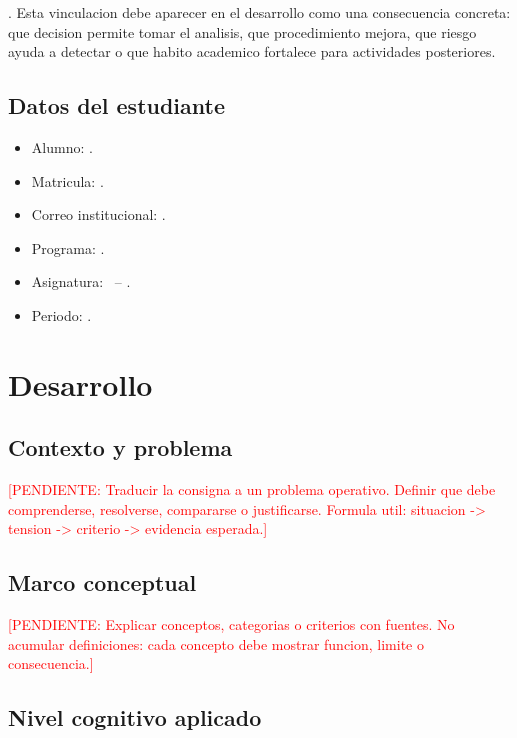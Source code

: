 \documentclass[
	spanish,
	letterpaper, oneside
]{article}
\newcommand{\pendiente}[1]{\textcolor{red}{[PENDIENTE: #1]}}
\begin{document}
\itescaprofessionalprofile. Esta vinculacion debe aparecer en el desarrollo
como una consecuencia concreta: que decision permite tomar el analisis, que
procedimiento mejora, que riesgo ayuda a detectar o que habito academico
fortalece para actividades posteriores.

\subsection{Datos del estudiante}

\begin{itemize}
	\item Alumno: \itescastudentname.
	\item Matricula: \itescastudentid.
	\item Correo institucional: \itescastudentemail.
	\item Programa: \itescafaculty.
	\item Asignatura: \itescacoursecode\ -- \itescacoursename.
	\item Periodo: \itescaprogramperiod.
\end{itemize}


\section{Desarrollo}

\subsection{Contexto y problema}

\pendiente{Traducir la consigna a un problema operativo. Definir que debe comprenderse, resolverse, compararse o justificarse. Formula util: situacion -> tension -> criterio -> evidencia esperada.}

\subsection{Marco conceptual}

\pendiente{Explicar conceptos, categorias o criterios con fuentes. No acumular definiciones: cada concepto debe mostrar funcion, limite o consecuencia.}

\subsection{Nivel cognitivo aplicado}
\end{document}
